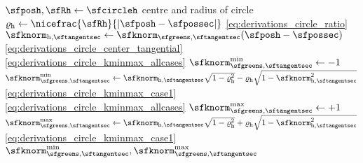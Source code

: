 \begin{algorithmic}[1]
  \State $\sfposh, \sfRh \gets \sfcircleh$
  \Comment centre and radius of circle
  \State $\varrho_{\mathrm h} \gets 
  \nicefrac{\sfRh}{|\sfposh-\sfpossec|}$
  \Comment \eqref{eq:derivations_circle_ratio}
  \State $\sfknorm_{\mathrm h, \sftangentsec} \gets
  \sfknorm_{\sfgreens,\sftangentsec}(\sfposh - 
  \sfpossec)$
  \Comment \eqref{eq:derivations_circle_center_tangential}
  \Comment \eqref{eq:derivations_circle_kminmax_allcases}
  \State $\sfknorm^{\min}_{\sfgreens, \sftangentsec} \gets -1$
  \Else
  \State $\sfknorm^{\min}_{\sfgreens, \sftangentsec} \gets 
  \sfknorm_{\mathrm h, \sftangentsec} \sqrt{1-\varrho_{\mathrm h}^2}
  - \varrho_{\mathrm h} \sqrt{1 - \sfknorm_{\mathrm h, \sftangentsec}^2}  
  $
  \Comment \eqref{eq:derivations_circle_kminmax_case1}
  \EndIf
  \Comment \eqref{eq:derivations_circle_kminmax_allcases}
  \State $\sfknorm^{\max}_{\sfgreens, \sftangentsec} \gets +1$
  \Else
  \State $\sfknorm^{\max}_{\sfgreens, \sftangentsec} \gets 
  \sfknorm_{\mathrm h, \sftangentsec} \sqrt{1-\varrho_{\mathrm h}^2}
  + \varrho_{\mathrm h} \sqrt{1 - \sfknorm_{\mathrm h, \sftangentsec}^2} $
  \Comment \eqref{eq:derivations_circle_kminmax_case1}
  \EndIf
  \State \Return $\sfknorm^{\min}_{\sfgreens, \sftangentsec},
  \sfknorm^{\max}_{\sfgreens, \sftangentsec}$
  \EndFunction
\end{algorithmic}